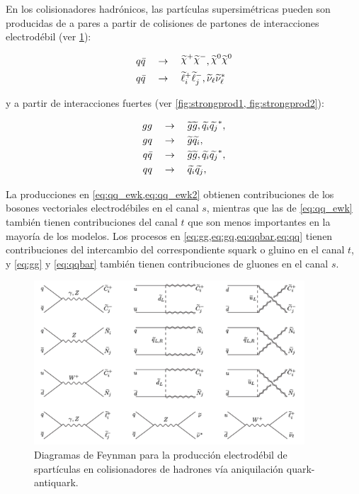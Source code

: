 En los colisionadores hadrónicos, las partículas supersimétricas pueden son
producidas de a pares a partir de colisiones de partones de interacciones
electrodébil (ver \cref{fig:ewkprod}):

\begin{align}
  &q\bar{q} \quad \to \quad \chinop \chinom, \nino \nino \label{eq:qq_ewk} \\
  &q\bar{q} \quad \to \quad \susy{\ell}^{+}_{i}\susy{\ell}^{-}_{j}, \susy{\nu}_{\ell}\susy{\nu}^{*}_{\ell} \label{eq:qq_ewk2}
\end{align}

y a partir de interacciones fuertes (ver \cref{fig:strongprod1, fig:strongprod2}):

\begin{align}
  gg \quad &\rightarrow \quad \widetilde{g}\widetilde{g}, \widetilde{q_i}\widetilde{q_j}^{*}, \label{eq:gg} \\
  gq \quad &\rightarrow \quad \widetilde{g}\widetilde{q_i}, \label{eq:gq} \\
  q\bar{q} \quad &\rightarrow \quad \widetilde{g}\widetilde{g}, \widetilde{q_i}\widetilde{q_j}^{*}, \label{eq:qqbar} \\
  qq \quad &\rightarrow \quad \widetilde{q_i}\widetilde{q_j}, \label{eq:qq}
\end{align}

La producciones en \cref{eq:qq_ewk,eq:qq_ewk2} obtienen contribuciones de los
bosones vectoriales electrodébiles en el canal $s$, mientras que las de
\cref{eq:qq_ewk} también tienen contribuciones del canal $t$ que son menos
importantes en la mayoría de los modelos. Los procesos en
\cref{eq:gg,eq:gq,eq:qqbar,eq:qq} tienen contribuciones del intercambio del
correspondiente squark o gluino en el canal $t$, y \cref{eq:gg} y
\cref{eq:qqbar} también tienen contribuciones de gluones en el canal $s$.

\begin{figure}[h]
  \centering \includegraphics[width=0.9\textwidth]{figures/figure_101}
  \caption{Diagramas de Feynman para la producción electrodébil de spartículas
    en colisionadores de hadrones vía aniquilación quark-antiquark.}
  \label{fig:ewkprod}
\end{figure}

